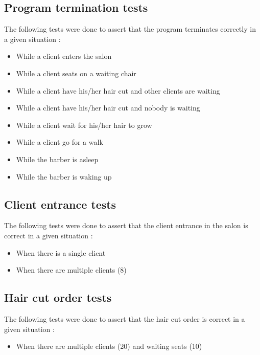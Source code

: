 \documentclass{article}
\begin{document}
    \subsection{Program termination tests}
    The following tests were done to assert that the program terminates correctly in a given situation :
    \begin{itemize}
        \item While a client enters the salon
        \item While a client seats on a waiting chair
        \item While a client have his/her hair cut and other clients are waiting
        \item While a client have his/her hair cut and nobody is waiting
        \item While a client wait for his/her hair to grow
        \item While a client go for a walk
        \item While the barber is asleep
        \item While the barber is waking up
    \end{itemize}

    \subsection{Client entrance tests}
    The following tests were done to assert that the client entrance in the salon is correct in a given situation :
    \begin{itemize}
        \item When there is a single client
        \item When there are multiple clients (8)
    \end{itemize}

    \subsection{Hair cut order tests}
    The following tests were done to assert that the hair cut order is correct in a given situation :
    \begin{itemize}
        \item When there are multiple clients (20) and waiting seats (10)
    \end{itemize}
\end{document}
